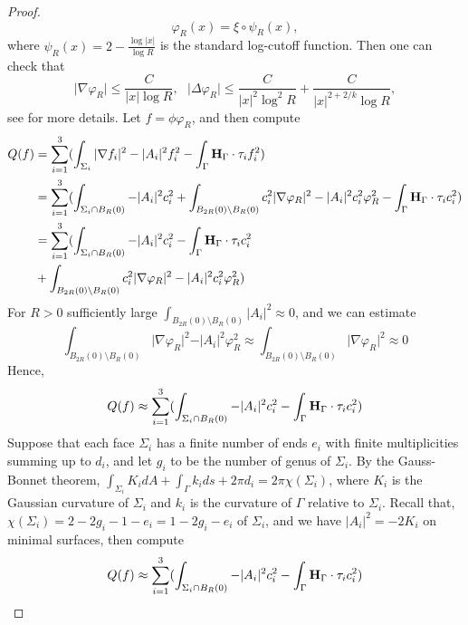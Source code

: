 \documentclass[11pt]{amsart}
\numberwithin{equation}{section}
\theoremstyle{theorem}
\theoremstyle{definition}
\numberwithin{equation}{section}
\begin{document}
\begin{proof}
$$
\varphi_R(x)=\xi\circ \psi_R(x),
$$
where $\psi_R(x)=2-\frac{\log\vert x\vert}{\log R}$ is the standard log-cutoff function. Then one can check that
$$
\vert \nabla \varphi_R\vert \leq \frac{C}{\vert x\vert \log R},\ \ \ \vert \Delta \varphi_R \vert \leq \frac{C}{\vert x\vert^2 \log^2R}+\frac{C}{\vert x\vert^{2+2/k}\log R},
$$
see \cite{chodosh2023topology} for more details. 
Let $f=\phi \varphi_R$, and then compute
\begin{equation}
\nonumber
\begin{split}
Q(f)&=\underset{i=1}{\overset{3}{\sum}}(\int_{\Sigma_i}\vert \nabla f_i\vert^2 -\vert A_i\vert^2f_i^2 -\int_{\Gamma} \bold{H}_{\Gamma}\cdot \tau_i f_i^2)\\
&=\underset{i=1}{\overset{3}{\sum}}(\int_{\Sigma_i\cap B_R(0)} -\vert A_i\vert^2c_i^2 +\int_{B_{2R}(0)\setminus B_R(0)} c_i^2\vert \nabla \varphi_R \vert^2 -\vert A_i\vert^2c_i^2\varphi_R^2 -\int_{\Gamma} \bold{H}_{\Gamma}\cdot \tau_i c_i^2)\\
&=\underset{i=1}{\overset{3}{\sum}}(\int_{\Sigma_i\cap B_R(0)} -\vert A_i\vert^2c_i^2  -\int_{\Gamma} \bold{H}_{\Gamma}\cdot \tau_i c_i^2\\
&+\int_{B_{2R}(0)\setminus B_R(0)} c_i^2\vert \nabla \varphi_R \vert^2 -\vert A_i\vert^2c_i^2\varphi_R^2)
\end{split}
\end{equation}
For $R>0$ sufficiently large $\int_{B_{2R}(0)\setminus B_R(0)}\vert A_i\vert^2 \approx 0$, and we can estimate
$$
\int_{B_{2R}(0)\setminus B_R(0)} \vert \nabla \varphi_R \vert^2 -\vert A_i\vert^2 \varphi_R^2 \approx \int_{B_{2R}(0)\setminus B_R(0)} \vert \nabla \varphi_R \vert^2 \approx 0
$$
Hence,
$$
Q(f)\approx \underset{i=1}{\overset{3}{\sum}}(\int_{\Sigma_i\cap B_R(0)} -\vert A_i\vert^2c_i^2  -\int_{\Gamma} \bold{H}_{\Gamma}\cdot \tau_i c_i^2)
$$
Suppose that each face $\Sigma_i$ has a finite number of ends $e_i$ with finite multiplicities summing up to $d_i$, and let $g_i$ to be the number of genus of $\Sigma_i$. By the Gauss-Bonnet theorem,
$\int_{\Sigma_i}K_idA+\int_{\Gamma}k_ids + 2\pi d_i=2\pi \chi (\Sigma_i)$, where $K_i$ is the Gaussian curvature of $\Sigma_i$ and $k_i$ is the curvature of $\Gamma$ relative to $\Sigma_i$. Recall that,
$\chi(\Sigma_i )=2-2g_i-1-e_i=1-2g_i-e_i$ of $\Sigma_i$, and we have $\vert A_i\vert^2 =-2K_i$ on minimal surfaces, then compute
\begin{equation}
\nonumber
\begin{split}
Q(f)&\approx \underset{i=1}{\overset{3}{\sum}}(\int_{\Sigma_i\cap B_R(0)} -\vert A_i\vert^2c_i^2  -\int_{\Gamma} \bold{H}_{\Gamma}\cdot \tau_i c_i^2)\\

\end{split}
\end{equation}
\end{proof}
\end{document}

